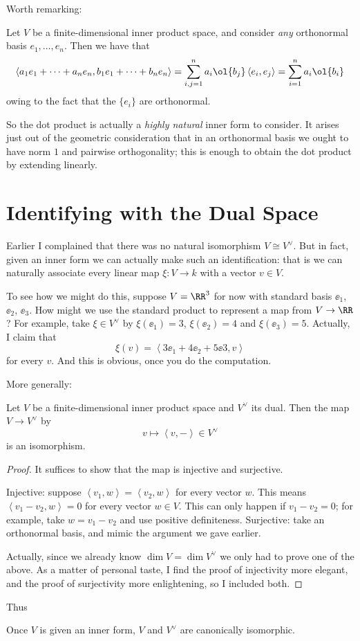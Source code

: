Worth remarking:
\begin{example}
	Let $V$ be a finite-dimensional inner product space,
	and consider \emph{any} orthonormal basis $e_1, \dots, e_n$.
	Then we have that
	\[ \left< a_1e_1 + \dots + a_ne_n, b_1e_1 + \dots + b_ne_n \right> 
		= \sum_{i,j=1}^n a_i\ol{b_j} \left< e_i, e_j \right>
		= \sum_{i=1}^n a_i \ol{b_i} \]
	owing to the fact that the $\{e_i\}$ are orthonormal.
\end{example}
So the dot product is actually a \emph{highly natural} inner form to consider.
It arises just out of the geometric consideration that in an orthonormal basis
we ought to have norm $1$ and pairwise orthogonality;
this is enough to obtain the dot product by extending linearly.


\section{Identifying with the Dual Space}
Earlier I complained that there was no natural isomorphism $V \cong V^\vee$.
But in fact, given an inner form we can actually make such an identification:
that is we can naturally associate every linear map $\xi : V \to k$ with a vector $v \in V$.

To see how we might do this, suppose $V = \RR^3$ for now with standard basis $\ee_1$, $\ee_2$, $\ee_3$.
How might we use the standard product to represent a map from $V \to \RR$?
For example, take $\xi \in V^\vee$ by $\xi(\ee_1) = 3$, $\xi(\ee_2) = 4$ and $\xi(\ee_3) = 5$.
Actually, I claim that
\[ \xi(v) = \left< 3\ee_1 + 4\ee_2 + 5\ee3, v \right> \]
for every $v$.
And this is obvious, once you do the computation.

More generally:
\begin{theorem}
	Let $V$ be a finite-dimensional inner product space and $V^\vee$ its dual.
	Then the map $V \to V^\vee$ by
	\[ v \mapsto \left<  v, - \right> \in V^\vee \]
	is an isomorphism.
\end{theorem}
\begin{proof}
	It suffices to show that the map is injective and surjective.
	\begin{itemize}
		\ii Injective: suppose $\left< v_1, w \right> = \left< v_2, w \right>$
		for every vector $w$.
		This means $\left< v_1 - v_2, w \right> = 0$ for every vector $w \in V$.
		This can only happen if $v_1 - v_2 = 0$; for example, take $w = v_1 - v_2$
		and use positive definiteness.
		\ii Surjective: take an orthonormal basis, and mimic the argument we gave earlier.
	\end{itemize}
	Actually, since we already know $\dim V = \dim V^\vee$ we only had to prove one of the above.
	As a matter of personal taste, I find the proof of injectivity more elegant,
	and the proof of surjectivity more enlightening, so I included both.
\end{proof}
Thus
\begin{moral}
	Once $V$ is given an inner form, $V$ and $V^\vee$ are canonically isomorphic.
\end{moral}

